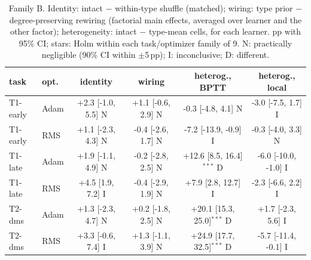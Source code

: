 \begin{table}[t]\centering\footnotesize
\caption{Family B. Identity: intact $-$ within-type shuffle (matched); wiring: type prior $-$ degree-preserving rewiring (factorial main effects, averaged over learner and the other factor); heterogeneity: intact $-$ type-mean cells, for each learner. pp with 95\% CI; stars: Holm within each task/optimizer family of 9. N: practically negligible (90\% CI within $\pm$5\,pp); I: inconclusive; D: different.}\label{tab:familyB}
\begin{tabular}{llcccc}\toprule
task & opt. & identity & wiring & heterog., BPTT & heterog., local\\ \midrule
T1-early & Adam & +2.3 [-1.0, 5.5] N & +1.1 [-0.6, 2.9] N & -0.3 [-4.8, 4.1] N & -3.0 [-7.5, 1.7] I\\
T1-early & RMS & +1.1 [-2.3, 4.3] N & -0.4 [-2.6, 1.7] N & -7.2 [-13.9, -0.9] I & -0.3 [-4.0, 3.3] N\\
T1-late & Adam & +1.9 [-1.1, 4.9] N & -0.2 [-2.8, 2.5] N & +12.6 [8.5, 16.4]$^{***}$ D & -6.0 [-10.0, -1.0] I\\
T1-late & RMS & +4.5 [1.9, 7.2] I & -0.4 [-2.9, 1.9] N & +7.9 [2.8, 12.7] I & -2.3 [-6.6, 2.2] I\\
T2-dms & Adam & +1.3 [-2.3, 4.7] N & +0.2 [-1.8, 2.5] N & +20.1 [15.3, 25.0]$^{***}$ D & +1.7 [-2.3, 5.6] I\\
T2-dms & RMS & +3.3 [-0.6, 7.4] I & +1.3 [-1.1, 3.9] N & +24.9 [17.7, 32.5]$^{***}$ D & -5.7 [-11.4, -0.1] I\\
\bottomrule\end{tabular}\end{table}
